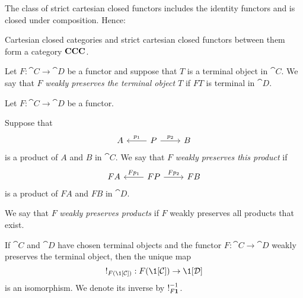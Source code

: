 The class of strict cartesian closed functors includes the identity functors and is closed under composition. Hence:

\begin{defn} \label{def:cat-ccc}
Cartesian closed categories and strict cartesian closed functors between them form a category $\mathbf{CCC}$.
\end{defn}


\begin{defn} \label{def:weak-preserve-terminal}
Let $F : \cat{C} \to \cat{D}$ be a functor and suppose that $T$ is a terminal object in $\cat{C}$. We say that $F$ \emph{weakly preserves the terminal object $T$} if $FT$ is terminal in $\cat{D}$.
\end{defn}

\begin{defn} \label{def:weak-preserve-products}
Let $F : \cat{C} \to \cat{D}$ be a functor.
\begin{enum}
\item Suppose that
\[\begin{tikzcd}
	A & P & B
	\arrow["{p_1}"', from=1-2, to=1-1]
	\arrow["{p_2}", from=1-2, to=1-3]
\end{tikzcd}\]
is a product of $A$ and $B$ in $\cat{C}$. We say that $F$ \emph{weakly preserves this product} if
\[\begin{tikzcd}
	FA & FP & FB
	\arrow["{Fp_1}"', from=1-2, to=1-1]
	\arrow["{Fp_2}", from=1-2, to=1-3]
\end{tikzcd}\]
is a product of $FA$ and $FB$ in $\cat{D}$.
\item We say that $F$ \emph{weakly preserves products} if $F$ weakly preserves all products that exist.
\end{enum}
\end{defn}

\begin{notn}
If $\cat{C}$ and $\cat{D}$ have chosen terminal objects and the functor $F : \cat{C} \to \cat{D}$ weakly preserves the terminal object, then the unique map
\[ \mterm[F(\1[\cat{C}])] : F(\1[\cat{C}]) \to \1[\cat{D}] \]
is an isomorphism. We denote its inverse by $\inv{\mterm[F\1]}$.
\end{notn}

